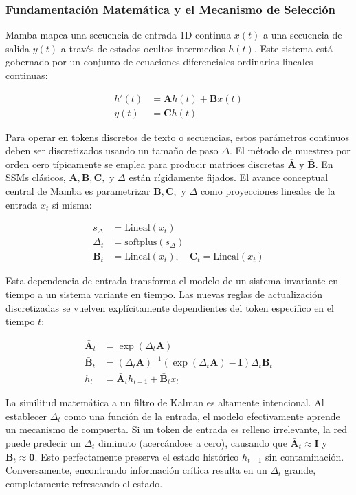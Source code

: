 \documentclass[11pt,a4paper]{article}
\begin{document}
\subsubsection{Fundamentación Matemática y el Mecanismo de Selección}

Mamba mapea una secuencia de entrada 1D continua $x(t)$ a una secuencia de salida $y(t)$ a través de estados ocultos intermedios $h(t)$. Este sistema está gobernado por un conjunto de ecuaciones diferenciales ordinarias lineales continuas:

$$
\begin{aligned}
h'(t) &= \mathbf{A}h(t) + \mathbf{B}x(t) \\
y(t) &= \mathbf{C}h(t)
\end{aligned}
$$

Para operar en tokens discretos de texto o secuencias, estos parámetros continuos deben ser discretizados usando un tamaño de paso $\Delta$. El método de muestreo por orden cero típicamente se emplea para producir matrices discretas $\bar{\mathbf{A}}$ y $\bar{\mathbf{B}}$. En SSMs clásicos, $\mathbf{A}, \mathbf{B}, \mathbf{C},$ y $\Delta$ están rígidamente fijados. El avance conceptual central de Mamba es parametrizar $\mathbf{B}, \mathbf{C},$ y $\Delta$ como proyecciones lineales de la entrada $x_t$ sí misma:

$$
\begin{aligned}
s_\Delta &= \text{Lineal}(x_t) \\
\Delta_t &= \text{softplus}(s_\Delta) \\
\mathbf{B}_t &= \text{Lineal}(x_t), \quad \mathbf{C}_t = \text{Lineal}(x_t)
\end{aligned}
$$

Esta dependencia de entrada transforma el modelo de un sistema invariante en tiempo a un sistema variante en tiempo. Las nuevas reglas de actualización discretizadas se vuelven explícitamente dependientes del token específico en el tiempo $t$:

$$
\begin{aligned}
\bar{\mathbf{A}}_t &= \exp(\Delta_t \mathbf{A}) \\
\bar{\mathbf{B}}_t &= (\Delta_t \mathbf{A})^{-1}(\exp(\Delta_t \mathbf{A}) - \mathbf{I})\Delta_t \mathbf{B}_t \\
h_t &= \bar{\mathbf{A}}_t h_{t-1} + \bar{\mathbf{B}}_t x_t
\end{aligned}
$$

La similitud matemática a un filtro de Kalman es altamente intencional. Al establecer $\Delta_t$ como una función de la entrada, el modelo efectivamente aprende un mecanismo de compuerta. Si un token de entrada es relleno irrelevante, la red puede predecir un $\Delta_t$ diminuto (acercándose a cero), causando que $\bar{\mathbf{A}}_t \approx \mathbf{I}$ y $\bar{\mathbf{B}}_t \approx \mathbf{0}$. Esto perfectamente preserva el estado histórico $h_{t-1}$ sin contaminación. Conversamente, encontrando información crítica resulta en un $\Delta_t$ grande, completamente refrescando el estado.
\end{document}
